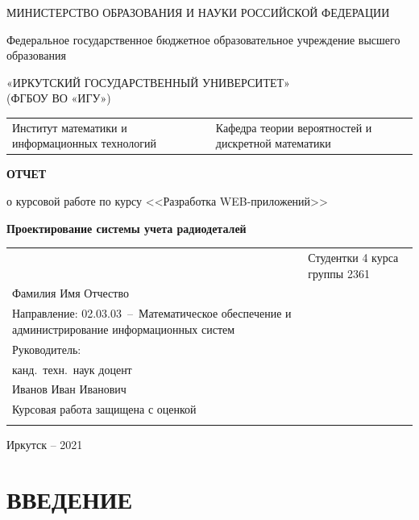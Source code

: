\documentclass[14pt,final]{report}
\begin{document}
\thispagestyle{empty}
\begin{center}
МИНИСТЕРСТВО ОБРАЗОВАНИЯ И НАУКИ РОССИЙСКОЙ ФЕДЕРАЦИИ

Федеральное государственное бюджетное образовательное учреждение высшего образования

«ИРКУТСКИЙ  ГОСУДАРСТВЕННЫЙ УНИВЕРСИТЕТ»\\
(ФГБОУ ВО «ИГУ»)
\end{center}
\vfill %

\noindent\begin{tabularx}{\textwidth} {
  >{\raggedright\arraybackslash}X
  >{\raggedright\arraybackslash}X }
Институт математики и информационных технологий
&
Кафедра теории вероятностей и дискретной математики
\end{tabularx}

\vfill
\begin{center}
  \textbf{ОТЧЕТ}
\vspace{1em}

о курсовой работе по курсу <<Разработка WEB-приложений>>

{\bf Проектирование системы учета радиодеталей}

\end{center}
\vfill

\noindent\begin{tabularx}{\textwidth} {
  >{\raggedright\arraybackslash}X
  >{\raggedright}X }
&

Студентки 4 курса группы 2361\\
Фамилия Имя Отчество\\
Направление\;: 02.03.03~--~Математическое обеспечение и администрирование информационных систем\\[2em]

Руководитель:\\
канд.~техн.~наук доцент\\
Иванов Иван Иванович\\[2em]

Курсовая работа защищена с оценкой\\[1em] \underline{\hspace{3cm}}
\end{tabularx}
\vfill
\begin{center}
  Иркутск -- 2021
\end{center}
\clearpage

\tableofcontents

\chapter*{ВВЕДЕНИЕ}
\label{chap:intro}
\end{document}
